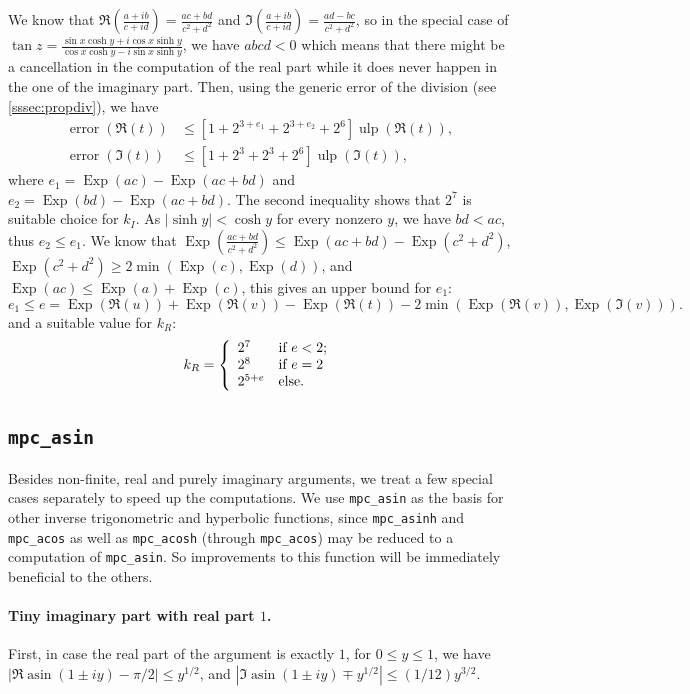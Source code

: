 \documentclass [11pt]{article}
\newcommand {\mpc}{{\tt mpc}}
\newcommand {\Ulp}{{\operatorname {ulp}}}
\DeclareMathOperator{\Exp}{\operatorname {Exp}}
\newcommand {\asin}{\operatorname {asin}}
\newcommand{\error}{\operatorname {error}}
\renewcommand {\leq}{\leqslant}
\renewcommand {\geq}{\geqslant}
\begin{document}
We know that $\Re(\frac{a+i b}{c+i d})=\frac{a c +b d}{c^2 + d^2}$ and
$\Im(\frac{a+i b}{c+i d})=\frac{a d -b c}{c^2 + d^2}$, so in the special case
of $\tan z=\frac{\sin x\cosh y+i\cos x\sinh y}{\cos x\cosh y-i\sin x\sinh y}$,
we have $abcd < 0$ which means that there might be a cancellation in the
computation of the real part while it does never happen in the one of the
imaginary part.  Then, using the generic error of the division (see
\ref{sssec:propdiv}), we have
\begin{align*}
\error(\Re(t)) &\leq [1+2^{3+e_1}+2^{3+e_2}+2^6] \Ulp(\Re(t)),
\\
\error(\Im(t)) &\leq [1+2^3+2^3+2^6] \Ulp(\Im(t)),
\end{align*}
where $e_1=\Exp(a c) -\Exp(a c+b d)$ and $e_2=\Exp(b d) -\Exp(a c+b d)$.  The
second inequality shows that $2^7$ is suitable choice for $k_I$. As $|\sinh
y|<\cosh y$ for every nonzero $y$, we have $bd<ac$, thus $e_2\leq e_1$. We
know that $\Exp(\frac{a c+b d}{c^2+d^2})\leq \Exp(a c+b d) -\Exp(c^2+d^2)$,
$\Exp(c^2+d^2)\geq2 \min(\Exp(c), \Exp(d))$, and $\Exp(ac) \leq \Exp(a) +
\Exp(c)$, this gives an upper bound for $e_1$:
\[
e_1 \leq e = \Exp(\Re(u)) +\Exp(\Re(v)) -\Exp(\Re(t))
-2 \min(\Exp(\Re(v)), \Exp(\Im(v))).
\]
and a suitable value for $k_R$:
\begin{equation*}
k_R=\left\{
\begin{array}{l l}
  2^7 & \mbox{if $e < 2$;}
  \\
  2^8 & \mbox{if $e = 2$}
  \\
  2^{5 + e} & \mbox{else.}
\end{array}
\right.
\end{equation*}

\subsection {\texttt {mpc\_asin}}

Besides non-finite, real and purely imaginary arguments, we treat a few
special cases separately to speed up the computations.
We use \texttt {\mpc\_asin} as the basis for other inverse trigonometric and
hyperbolic functions, since \texttt {mpc\_asinh} and \texttt {mpc\_acos}
as well as \texttt {mpc\_acosh} (through \texttt {mpc\_acos}) may be reduced
to a computation of \texttt {mpc\_asin}. So improvements to this function
will be immediately beneficial to the others.

\paragraph{Tiny imaginary part with real part $1$.}
First, in case the real part of the argument is exactly $1$,
for $0 \leq y \leq 1$, we have $|\Re \asin (1 \pm iy) - \pi/2|
\leq y^{1/2}$, and $|\Im \asin (1 \pm iy) \mp y^{1/2}| \leq (1/12) y^{3/2}$.
\end{document}
